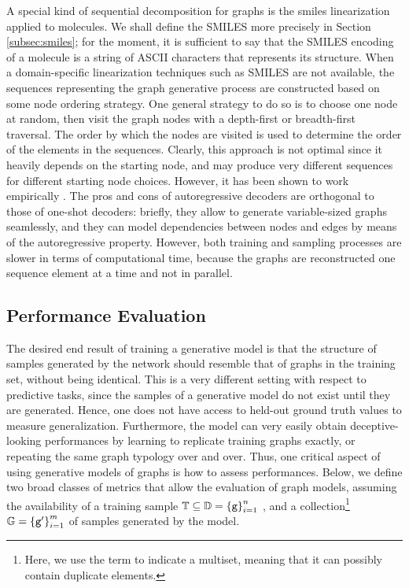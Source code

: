 A special kind of sequential decomposition for graphs is the \gls{smiles} linearization applied to molecules. We shall define the SMILES more precisely in Section \ref{subsec:smiles}; for the moment, it is sufficient to say that the SMILES encoding of a molecule is a string of ASCII characters that represents its structure. When a domain-specific linearization techniques such as SMILES are not available, the sequences representing the graph generative process are constructed based on some node ordering strategy. One general strategy to do so is to choose one node at random, then visit the graph nodes with a depth-first or breadth-first traversal. The order by which the nodes are visited is used to determine the order of the elements in the sequences. Clearly, this approach is not optimal since it heavily depends on the starting node, and may produce very different sequences for different starting node choices. However, it has been shown to work empirically \citep{you2018graphrnn,li2018learningdeepgmg,bacciu2019edgegraphgenrnn,goyal2020graphgen}. The pros and cons of autoregressive decoders are orthogonal to those of one-shot decoders: briefly, they allow to generate variable-sized graphs seamlessly, and they can model dependencies between nodes and edges by means of the autoregressive property. However, both training and sampling processes are slower in terms of computational time, because the graphs are reconstructed one sequence element at a time and not in parallel.

\subsection{Performance Evaluation}\label{sec:evaluation-generative-graphs}
The desired end result of training a generative model is that the structure of samples generated by the network should resemble that of graphs in the training set, without being identical. This is a very different setting with respect to predictive tasks, since the samples of a generative model do not exist until they are generated. Hence, one does not have access to held-out ground truth values to measure generalization. Furthermore, the model can very easily obtain deceptive-looking performances by learning to replicate training graphs exactly, or repeating the same graph typology over and over. Thus, one critical aspect of using generative models of graphs is how to assess performances. Below, we define two broad classes of metrics that allow the evaluation of graph models, assuming the availability of a training sample $\mathbb{T} \subseteq \mathbb{D} = \left\{ \mathtt{g} \right\}_{i=1}^n$ , and a collection\footnote{Here, we use the term  to indicate a multiset, meaning that it can possibly contain duplicate elements.} $\mathbb{G} = \left\{ \mathtt{g'} \right\}_{i=1}^m$ of samples generated by the model.

